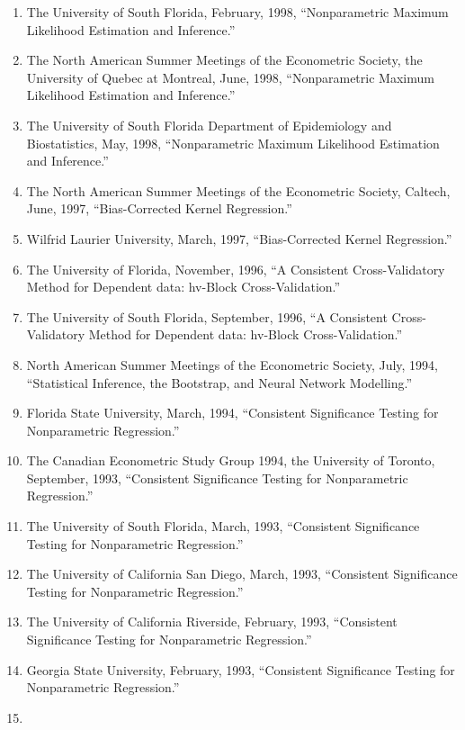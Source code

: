 \documentclass[
]{article}
\begin{document}
\begin{enumerate}
  Pennsylvania State University, October 9, 1998, ``Density Based
  Multinomial Choice.''
\item
  The University of South Florida, February, 1998, ``Nonparametric
  Maximum Likelihood Estimation and Inference.''
\item
  The North American Summer Meetings of the Econometric Society, the
  University of Quebec at Montreal, June, 1998, ``Nonparametric Maximum
  Likelihood Estimation and Inference.''
\item
  The University of South Florida Department of Epidemiology and
  Biostatistics, May, 1998, ``Nonparametric Maximum Likelihood
  Estimation and Inference.''
\item
  The North American Summer Meetings of the Econometric Society,
  Caltech, June, 1997, ``Bias-Corrected Kernel Regression.''
\item
  Wilfrid Laurier University, March, 1997, ``Bias-Corrected Kernel
  Regression.''
\item
  The University of Florida, November, 1996, ``A Consistent
  Cross-Validatory Method for Dependent data: hv-Block
  Cross-Validation.''
\item
  The University of South Florida, September, 1996, ``A Consistent
  Cross-Validatory Method for Dependent data: hv-Block
  Cross-Validation.''
\item
  North American Summer Meetings of the Econometric Society, July, 1994,
  ``Statistical Inference, the Bootstrap, and Neural Network
  Modelling.''
\item
  Florida State University, March, 1994, ``Consistent Significance
  Testing for Nonparametric Regression.''
\item
  The Canadian Econometric Study Group 1994, the University of Toronto,
  September, 1993, ``Consistent Significance Testing for Nonparametric
  Regression.''
\item
  The University of South Florida, March, 1993, ``Consistent
  Significance Testing for Nonparametric Regression.''
\item
  The University of California San Diego, March, 1993, ``Consistent
  Significance Testing for Nonparametric Regression.''
\item
  The University of California Riverside, February, 1993, ``Consistent
  Significance Testing for Nonparametric Regression.''
\item
  Georgia State University, February, 1993, ``Consistent Significance
  Testing for Nonparametric Regression.''
\item

\end{enumerate}
\end{document}
